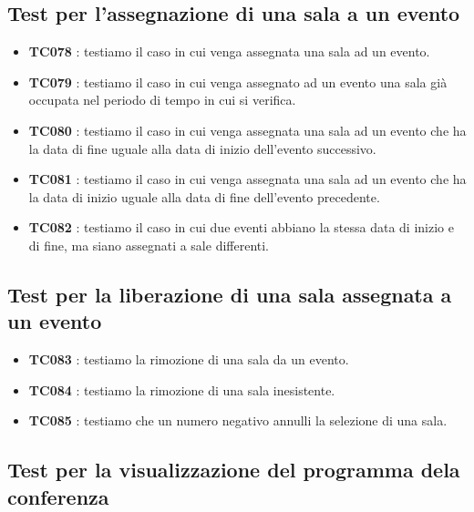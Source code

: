 \documentclass[11pt]{scrartcl} %
\begin{document}
\subsection{Test per l'assegnazione di una sala a un evento}

\begin{itemize}


	\item \textbf{TC078} : testiamo il caso in cui venga assegnata una sala ad un evento.

	\item \textbf{TC079} : testiamo il caso in cui venga assegnato ad un evento una sala già occupata nel periodo di tempo in cui si verifica.

	\item \textbf{TC080} : testiamo il caso in cui venga assegnata una sala ad un evento che ha la data di fine uguale alla data di inizio dell'evento successivo.

	\item \textbf{TC081} : testiamo il caso in cui venga assegnata una sala ad un evento che ha la data di inizio uguale alla data di fine dell'evento precedente.

	\item \textbf{TC082} : testiamo il caso in cui due eventi abbiano la stessa data di inizio e di fine, ma siano assegnati a sale differenti.


\end{itemize}

\subsection{Test per la liberazione di una sala assegnata a un evento}

\begin{itemize}

	\item \textbf{TC083} : testiamo la rimozione di una sala da un evento.

	\item \textbf{TC084} : testiamo la rimozione di una sala inesistente.

	\item \textbf{TC085} : testiamo che un numero negativo annulli la selezione di una sala.

\end{itemize}


\subsection{Test per la visualizzazione del programma dela conferenza}
\end{document}
